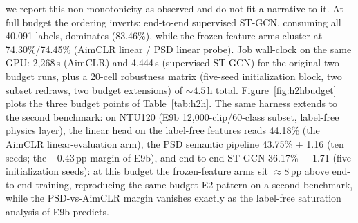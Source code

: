 we report this non-monotonicity as observed and do not fit a narrative to it. At full budget the ordering inverts: end-to-end supervised ST-GCN, consuming all 40{,}091 labels, dominates (83.46\%), while the frozen-feature arms cluster at 74.30\%/74.45\% (AimCLR linear / PSD linear probe). Job wall-clock on the same GPU: 2{,}268\,s (AimCLR) and 4{,}444\,s (supervised ST-GCN) for the original two-budget runs, plus a 20-cell robustness matrix (five-seed initialization block, two subset redraws, two budget extensions) of ${\sim}4.5$\,h total. Figure~\ref{fig:h2hbudget} plots the three budget points of Table~\ref{tab:h2h}. The same harness extends to the second benchmark: on NTU120 (E9b 12,000-clip/60-class subset, label-free physics layer), the linear head on the label-free features reads 44.18\% (the AimCLR linear-evaluation arm), the PSD semantic pipeline 43.75\% $\pm$ 1.16 (ten seeds; the $-0.43$\,pp margin of E9b), and end-to-end ST-GCN 36.17\% $\pm$ 1.71 (five initialization seeds): at this budget the frozen-feature arms sit ${\approx}8$\,pp above end-to-end training, reproducing the same-budget E2 pattern on a second benchmark, while the PSD-vs-AimCLR margin vanishes exactly as the label-free saturation analysis of E9b predicts.

